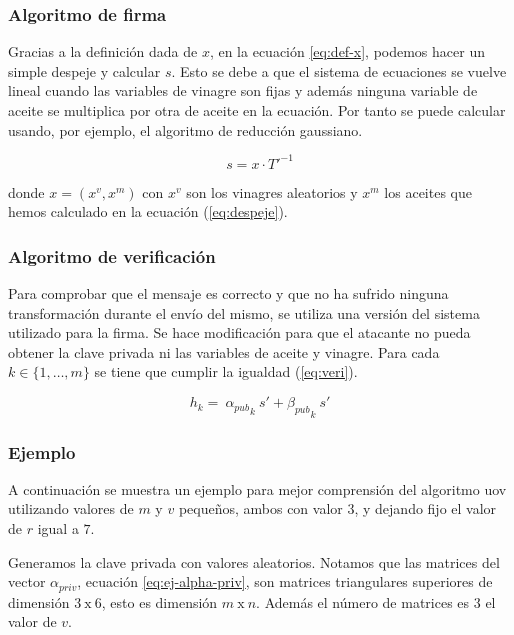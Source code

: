 \subsubsection{Algoritmo de firma}

Gracias a la definición dada de $x$, en la ecuación \ref{eq:def-x}, podemos hacer un simple despeje y calcular $s$. Esto se debe a que el sistema de ecuaciones se vuelve lineal cuando las variables de vinagre son fijas y además ninguna variable de aceite se multiplica por otra de aceite en la ecuación. Por tanto se puede calcular usando, por ejemplo, el algoritmo de reducción gaussiano.

\begin{equation}\label{eq:firma}
	s = x \cdot T'^{-1}
\end{equation}

donde $x = (x^v, x^m)$ con $x^v$ son los vinagres aleatorios y $x^m$ los aceites que hemos calculado en la ecuación (\ref{eq:despeje}).




\subsubsection{Algoritmo de verificación}

Para comprobar que el mensaje es correcto y que no ha sufrido ninguna transformación durante el envío del mismo, se utiliza una versión del sistema utilizado para la firma. Se hace modificación para que el atacante no pueda obtener la clave privada ni las variables de aceite y vinagre. Para cada $k \in  \{1,\dots, m\}$ se tiene que cumplir la igualdad (\ref{eq:veri}).


\begin{equation}\label{eq:veri}
	h_k = \ {\alpha_{pub}}_k \ s' + {\beta_{pub}}_{k} \ s'
\end{equation}

\subsubsection{Ejemplo}

A continuación se muestra un ejemplo para mejor comprensión del algoritmo \acrshort{uov} utilizando valores de $m$ y $v$ pequeños, ambos con valor $3$, y dejando fijo el valor de $r$ igual a $7$.

Generamos la clave privada con valores aleatorios. Notamos que las matrices del vector $\alpha_{priv}$, ecuación \ref{eq:ej-alpha-priv}, son matrices triangulares superiores de dimensión $3\ \mathrm{x}\ 6$, esto es dimensión $m\ \mathrm{x}\ n$. Además el número de matrices es $3$ el valor de $v$.

